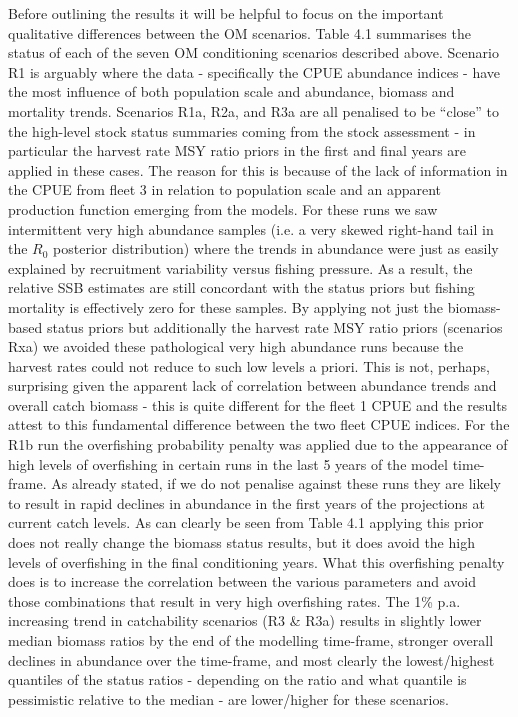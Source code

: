 \documentclass[11pt]{article}
\begin{document}
Before outlining the results it will be helpful to focus on the important qualitative differences between the OM scenarios. Table 4.1 summarises the status of each of the seven OM conditioning scenarios described above. Scenario R1 is arguably where the data - specifically the CPUE abundance indices - have the most influence of both population scale and abundance, biomass and mortality trends. Scenarios R1a, R2a, and R3a are all penalised to be “close” to the high-level stock status summaries coming from the stock assessment \cite{albsa} - in particular the harvest rate MSY ratio priors in the first and final years are applied in these cases. The reason for this is because of the lack of information in the CPUE from fleet 3 in relation to population scale and an apparent production function emerging from the models. For these runs we saw intermittent very high abundance samples (i.e. a very skewed right-hand tail in the $R_0$ posterior distribution) where the trends in abundance were just as easily explained by recruitment variability versus fishing pressure. As a result, the relative SSB estimates are still concordant with the status priors but fishing mortality is effectively zero for these samples. By applying not just the biomass-based status priors but additionally the harvest rate MSY ratio priors (scenarios Rxa) we avoided these pathological very high abundance runs because the harvest rates could not reduce to such low levels a priori. This is not, perhaps, surprising given the apparent lack of correlation between abundance trends and overall catch biomass - this is quite different for the fleet 1 CPUE and the results attest to this fundamental difference between the two fleet CPUE indices. For the R1b run the overfishing probability penalty was applied due to the appearance of high levels of overfishing in certain runs in the last 5 years of the model time-frame. As already
stated, if we do not penalise against these runs they are likely to result in rapid declines in abundance in the first years of the projections at current catch levels. As can clearly be seen from Table 4.1 applying this prior does not really change the biomass status results, but it does avoid the high levels of overfishing in the final conditioning years. What this overfishing penalty does is to increase the correlation between the various parameters and avoid those combinations that result in very high overfishing rates. The 1\% p.a. increasing trend in catchability scenarios (R3 \& R3a) results in slightly lower median biomass ratios by the end of the modelling time-frame, stronger overall declines in abundance over the time-frame, and most clearly the lowest/highest quantiles of the status ratios - depending on the ratio and what quantile is pessimistic relative to the median - are lower/higher for these scenarios.
\end{document}
